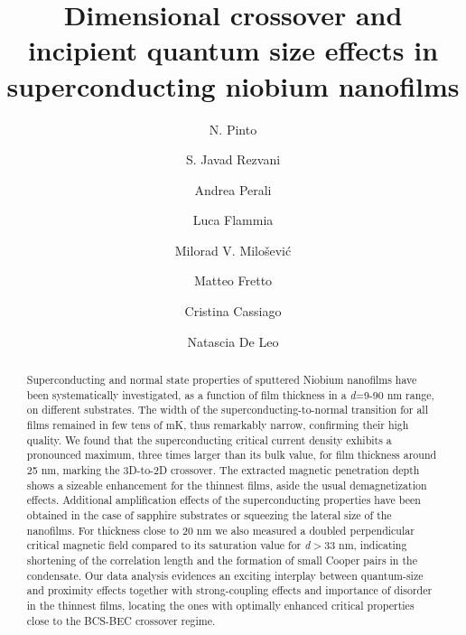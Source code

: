 \documentclass[reprint,onecolumn,superscriptaddress,a4paper,nofootinbib,floatfix]{revtex4-1}
\begin{document}
\title{Dimensional crossover and incipient quantum size effects in superconducting niobium nanofilms}

\author{N. Pinto}
\author{S. Javad Rezvani}
\author{Andrea Perali}
\author{Luca Flammia}
\author{Milorad V. Milo\v{s}evi\'{c}}
\author{Matteo Fretto}
\author{Cristina Cassiago}
\author{Natascia De Leo}


\begin{abstract}
Superconducting and normal state properties of sputtered Niobium nanofilms have been systematically investigated, as a function of film thickness in a \textit{d}=9-90 nm range, on different substrates. The width of the superconducting-to-normal transition for all films remained in few tens of mK, thus remarkably narrow, confirming their high quality. We found that the superconducting critical current density exhibits a pronounced maximum, three times larger than its bulk value, for film thickness around 25 nm, marking the 3D-to-2D crossover. The extracted magnetic penetration depth shows a sizeable enhancement for the thinnest films, aside the usual demagnetization effects. Additional amplification effects of the superconducting properties have been obtained in the case of sapphire substrates or squeezing the lateral size of the nanofilms. For thickness close to 20 nm we also measured a doubled perpendicular critical magnetic field compared to its saturation value for \textit{d}$>$33 nm, indicating shortening of the correlation length and the formation of small Cooper pairs in the condensate. Our data analysis evidences an exciting interplay between quantum-size and proximity effects together with strong-coupling effects and importance of disorder in the thinnest films, locating the ones with optimally enhanced critical properties close to the BCS-BEC crossover regime.
\end{abstract}
\end{document}
